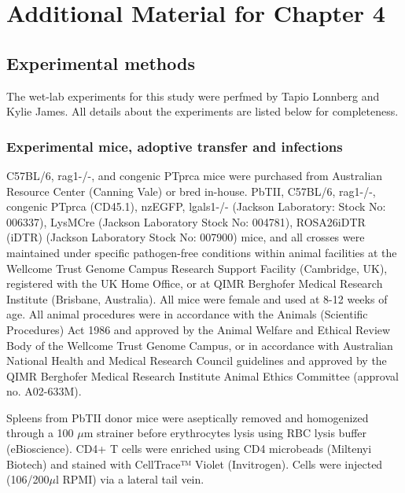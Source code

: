 
\chapter{Additional Material for Chapter 4}

\graphicspath{{Appendix3/Figs/}}

\section{Experimental methods} \label{sec:malaria-methods}

The wet-lab experiments for this study were perfmed by Tapio Lonnberg and Kylie James. All details about the experiments are listed below for completeness.

\subsection{Experimental mice, adoptive transfer and infections}

\begin{sloppypar}
C57BL/6, rag1-/-, and congenic PTprca mice were purchased from Australian Resource Center (Canning Vale) or bred in-house. PbTII, C57BL/6, rag1-/-, congenic PTprca (CD45.1), nzEGFP, lgals1-/- (Jackson Laboratory: Stock No: 006337), LysMCre (Jackson Laboratory Stock No: 004781), ROSA26iDTR (iDTR) (Jackson Laboratory Stock No: 007900) mice, and all crosses were maintained under specific pathogen-free conditions within animal facilities at the Wellcome Trust Genome Campus Research Support Facility (Cambridge, UK), registered with the UK Home Office, or at QIMR Berghofer Medical Research Institute (Brisbane, Australia). All mice were female and used at 8-12 weeks of age. All animal procedures were in accordance with the Animals (Scientific Procedures) Act 1986 and approved by the Animal Welfare and Ethical Review Body of the Wellcome Trust Genome Campus, or in accordance with Australian National Health and Medical Research Council guidelines and approved by the QIMR Berghofer Medical Research Institute Animal Ethics Committee (approval no. A02-633M).
\end{sloppypar}

Spleens from PbTII donor mice were aseptically removed and homogenized through a 100 \( \mu \)m strainer before erythrocytes lysis using RBC lysis buffer (eBioscience). CD4+ T cells were enriched using CD4 microbeads (Miltenyi Biotech) and stained with CellTrace™ Violet (Invitrogen). Cells were injected (106/200\( \mu \)l RPMI) via a lateral tail vein.

